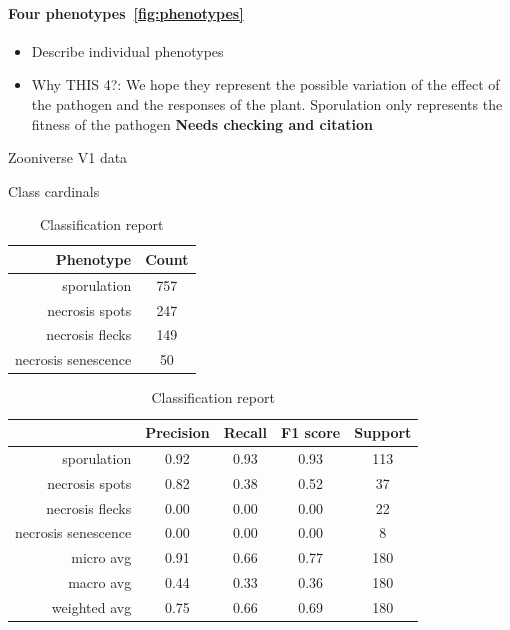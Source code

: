\documentclass[english]{article}
\begin{document}
\paragraph{Four phenotypes~\ref*{fig:phenotypes}}
\begin{itemize}
	\item Describe individual phenotypes
	\item Why THIS 4?: We hope they represent the possible variation of the effect of the pathogen and the responses of the plant. Sporulation only represents the fitness of the pathogen \textbf{Needs checking and citation}
\end{itemize}

\begin{table}[H]
	\caption{Zooniverse V1 data}\label{tab:zv1data}
	\begin{minipage}{0.4\linewidth}
		\caption{Class cardinals}\label{tab:zoonv1classcardinals}
		\begin{tabular}{rc}
			\toprule
			Phenotype           & Count \\
			\midrule
			sporulation         & 757   \\
			necrosis spots      & 247   \\
			necrosis flecks     & 149   \\
			necrosis senescence & 50    \\
			\bottomrule
		\end{tabular}
	\end{minipage}%
	\begin{minipage}{0.4\linewidth}
		\centering
		\caption{Classification report}\label{tab:zv1mcr}
		\begin{tabular}{rcccc}
			\toprule
			{}                                    & Precision & Recall & F1 score & Support \\
			\midrule
			sporulation                           & 0.92      & 0.93   & 0.93     & 113     \\
			necrosis spots                        & 0.82      & 0.38   & 0.52     & 37      \\
			\rowcolor{red!25} necrosis flecks     & 0.00      & 0.00   & 0.00     & 22      \\
			\rowcolor{red!25} necrosis senescence & 0.00      & 0.00   & 0.00     & 8       \\
			micro avg                             & 0.91      & 0.66   & 0.77     & 180     \\
			macro avg                             & 0.44      & 0.33   & 0.36     & 180     \\
			weighted avg                          & 0.75      & 0.66   & 0.69     & 180     \\
			\bottomrule
		\end{tabular}
	\end{minipage}
\end{table}
\end{document}

